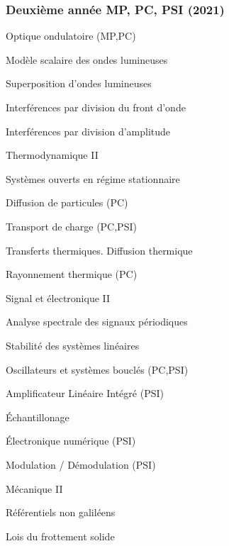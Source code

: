 \newpage

\subsubsection*{Deuxième année MP, PC, PSI (2021)}
\begin{multicols}{2}
\begin{programme}
    \item Optique ondulatoire (MP,PC)
    \begin{programme}
        \item Modèle scalaire des ondes lumineuses
        \item Superposition d’ondes lumineuses 
        \item Interférences par division du front d’onde
        \item Interférences par division d'amplitude
    \end{programme}
    \item Thermodynamique II
    \begin{programme}
        \item Systèmes ouverts en régime stationnaire
        \item Diffusion de particules (PC)
        \item Transport de charge (PC,PSI)
        \item Transferts thermiques. Diffusion thermique
        \item Rayonnement thermique (PC)
    \end{programme}
    \item Signal et électronique II
    \begin{programme}
        \item Analyse spectrale des signaux périodiques
        \item Stabilité des systèmes linéaires
        \item Oscillateurs et systèmes bouclés (PC,PSI)
        \item Amplificateur Linéaire Intégré (PSI)
        \item Échantillonage
        \item Électronique numérique (PSI)
        \item Modulation / Démodulation (PSI)
    \end{programme}
    \item Mécanique II
    \begin{programme}
        \item Référentiels  non galiléens
        \item Lois du frottement solide

\end{programme}
\end{programme}
\end{multicols}
